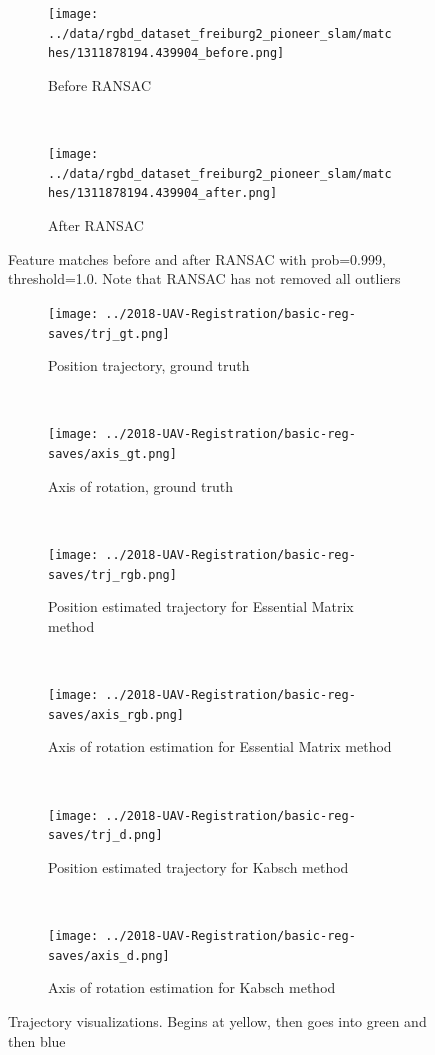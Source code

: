 \documentclass[12pt,a4paper]{article}
\begin{document}
\begin{figure}[t!]
  \centering
  \begin{subfigure}[t]{\textwidth}
  \centering
    \texttt{[image: ../data/rgbd\_dataset\_freiburg2\_pioneer\_slam/matches/1311878194.439904\_before.png]}
  \caption{Before RANSAC}
  \end{subfigure}
  \\
  \begin{subfigure}[t]{\textwidth}
  \centering
    \texttt{[image: ../data/rgbd\_dataset\_freiburg2\_pioneer\_slam/matches/1311878194.439904\_after.png]}
  \caption{After RANSAC}
  \end{subfigure}
  \caption{Feature matches before and after RANSAC with prob=0.999, threshold=1.0. Note that RANSAC has not removed all outliers}
  \label{f: D415 offset}
\end{figure}

\begin{figure}[t!]
  \centering
  \begin{subfigure}[t]{0.5\textwidth}
  \centering
    \texttt{[image: ../2018-UAV-Registration/basic-reg-saves/trj\_gt.png]}
  \caption{Position trajectory, ground truth}
  \end{subfigure}%
  ~
  \begin{subfigure}[t]{0.5\textwidth}
  \centering
    \texttt{[image: ../2018-UAV-Registration/basic-reg-saves/axis\_gt.png]}
  \caption{Axis of rotation, ground truth}
  \end{subfigure}
  \\
  \begin{subfigure}[t]{0.5\textwidth}
  \centering
    \texttt{[image: ../2018-UAV-Registration/basic-reg-saves/trj\_rgb.png]}
  \caption{Position estimated trajectory for Essential Matrix method}
  \end{subfigure}%
  ~
  \begin{subfigure}[t]{0.5\textwidth}
  \centering
    \texttt{[image: ../2018-UAV-Registration/basic-reg-saves/axis\_rgb.png]}
  \caption{Axis of rotation estimation for Essential Matrix method}
  \end{subfigure}
  \\
  \begin{subfigure}[t]{0.5\textwidth}
  \centering
    \texttt{[image: ../2018-UAV-Registration/basic-reg-saves/trj\_d.png]}
  \caption{Position estimated trajectory for Kabsch method}
  \end{subfigure}%
  ~
  \begin{subfigure}[t]{0.5\textwidth}
  \centering
    \texttt{[image: ../2018-UAV-Registration/basic-reg-saves/axis\_d.png]}
  \caption{Axis of rotation estimation for Kabsch method}
  \end{subfigure}
  \caption{Trajectory visualizations. Begins at yellow, then goes into green and then blue}
  \label{f: D415 offset}
\end{figure}
\end{document}
